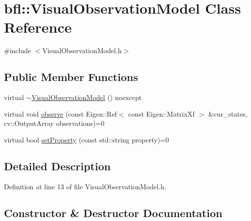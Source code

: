 \hypertarget{classbfl_1_1VisualObservationModel}{}\section{bfl\+:\+:Visual\+Observation\+Model Class Reference}
\label{classbfl_1_1VisualObservationModel}


{\ttfamily \#include $<$Visual\+Observation\+Model.\+h$>$}

\subsection*{Public Member Functions}
\begin{DoxyCompactItemize}
\item 
virtual \mbox{\hyperlink{classbfl_1_1VisualObservationModel_a71efc17b5dd4a1edf09cd8f858cd8145}{$\sim$\+Visual\+Observation\+Model}} () noexcept
\item 
virtual void \mbox{\hyperlink{classbfl_1_1VisualObservationModel_aa85438d953ae87839b8bd1064817cfa7}{observe}} (const Eigen\+::\+Ref$<$ const Eigen\+::\+Matrix\+Xf $>$ \&cur\+\_\+states, cv\+::\+Output\+Array observations)=0
\item 
virtual bool \mbox{\hyperlink{classbfl_1_1VisualObservationModel_a06a81257554785084b6cb9488e9d89c6}{set\+Property}} (const std\+::string property)=0
\end{DoxyCompactItemize}


\subsection{Detailed Description}


Definition at line 13 of file Visual\+Observation\+Model.\+h.



\subsection{Constructor \& Destructor Documentation}
\mbox{\label{classbfl_1_1VisualObservationModel_a71efc17b5dd4a1edf09cd8f858cd8145}} 
